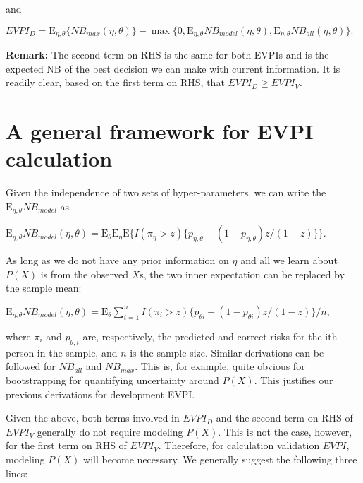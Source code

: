 \documentclass[
]{article}
\begin{document}
and

\begin{center}
$EVPI_D = \text{E}_{\eta,\theta}\{NB_{max}(\eta,\theta)\} - \max\{0,\text{E}_{\eta,\theta}NB_{model}(\eta,\theta),\text{E}_{\eta,\theta}NB_{all}(\eta,\theta) \}.$ 
\end{center}

\textbf{Remark:} The second term on RHS is the same for both EVPIs and
is the expected NB of the best decision we can make with current
information. It is readily clear, based on the first term on RHS, that
\(EVPI_D \geq EVPI_V\).

\section{A general framework for EVPI calculation}

Given the independence of two sets of hyper-parameters, we can write the
\(\text{E}_{\eta,\theta}NB_{model}\) as

\begin{center}
$\text{E}_{\eta,\theta}NB_{model}(\eta,\theta)=\text{E}_\theta\text{E}_\eta\text{E}\{{I(\pi_\eta>z)\{p_{\eta,\theta}-(1-p_{\eta,\theta})z/(1-z)}\}\}$.\end{center}

As long as we do not have any prior information on \(\eta\) and all we
learn about \(P(X)\) is from the observed \(X\)s, the two inner
expectation can be replaced by the sample mean:

\begin{center}
$
\text{E}_{\eta,\theta}NB_{model}(\eta,\theta)=\text{E}_\theta\sum_{i=1}^{n}{I(\pi_i>z)\{p_{\theta i}-(1-p_{\theta i})z/(1-z)}\}/n,$ 
\end{center}

where \(\pi_i\) and \(p_{\theta,i}\) are, respectively, the predicted
and correct risks for the ith person in the sample, and \(n\) is the
sample size. Similar derivations can be followed for \(NB_{all}\) and
\(NB_{max}\). This is, for example, quite obvious for bootstrapping for
quantifying uncertainty around \(P(X)\). This justifies our previous
derivations for development EVPI.

Given the above, both terms involved in \(EVPI_D\) and the second term
on RHS of \(EVPI_V\) generally do not require modeling \(P(X)\). This is
not the case, however, for the first term on RHS of \(EVPI_V\).
Therefore, for calculation validation \(EVPI\), modeling \(P(X)\) will
become necessary. We generally suggest the following three lines:
\end{document}
